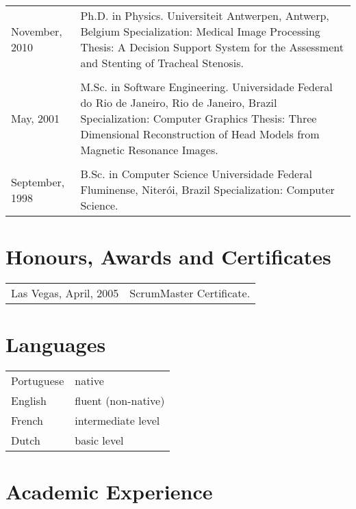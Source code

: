 \begin{longtable}{l p{}}
November, 2010 & Ph.D. in Physics. \newline 
Universiteit Antwerpen, Antwerp, Belgium \newline 
Specialization: Medical Image Processing \newline 
Thesis: A Decision Support System for the Assessment and Stenting of Tracheal Stenosis. \\
\\
May, 2001 & M.Sc. in Software Engineering. \newline 
Universidade Federal do Rio de Janeiro, Rio de Janeiro, Brazil \newline 
Specialization: Computer Graphics \newline 
Thesis: Three Dimensional Reconstruction of Head Models from Magnetic Resonance Images. \\
\\
September, 1998 & B.Sc.  in Computer Science \newline 
Universidade Federal Fluminense, Niter\'oi, Brazil \newline 
Specialization: Computer Science.\\
\end{longtable}


\section{Honours, Awards and Certificates}

\begin{tabular}{p{} p{}}
Las Vegas, April, 2005 & ScrumMaster Certificate.
\end{tabular}

\section{Languages}

\begin{tabular}{l p{}}
Portuguese & native\\
English & fluent (non-native)\\
French & intermediate level\\
Dutch & basic level\\
\end{tabular}



\section{Academic Experience}


